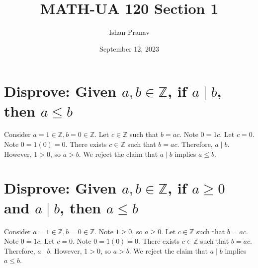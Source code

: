 \documentclass[12pt]{article}
\title{MATH-UA 120 Section 1}
\author{Ishan Pranav}
\date{September 12, 2023}
\begin{document}
\maketitle
\section{Disprove: Given $a,b\in\mathbb{Z}$, if $a \mid b$, then $a\leq b$}
Consider $a=1\in\mathbb{Z},b=0\in\mathbb{Z}$. Let $c\in\mathbb{Z}$ such that $b=ac$. Note $0=1c$. Let $c=0$. Note $0=1(0)=0$. There exists $c\in\mathbb{Z}$ such that $b=ac$. Therefore, $a \mid b$. However, $1>0$, so $a>b$. We reject the claim that $a \mid b$ implies $a\leq b$.
\section{Disprove: Given $a,b\in\mathbb{Z}$, if $a\geq 0$ and $a \mid b$, then $a\leq b$}
Consider $a=1\in\mathbb{Z},b=0\in\mathbb{Z}$. Note $1\geq 0$, so $a\geq 0$. Let $c\in\mathbb{Z}$ such that $b=ac$. Note $0=1c$. Let $c=0$. Note $0=1(0)=0$. There exists $c\in\mathbb{Z}$ such that $b=ac$. Therefore, $a \mid b$. However, $1>0$, so $a>b$. We reject the claim that $a \mid b$ implies $a\leq b$.
\end{document}
